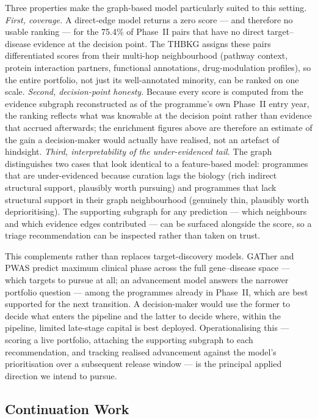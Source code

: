 \documentclass[a4,center]{NAR}
\begin{document}
{Three properties make the graph-based model particularly suited to this
setting. \emph{First, coverage.} A direct-edge model returns a zero
score --- and therefore no usable ranking --- for the 75.4\% of
Phase~II pairs that have no direct target--disease evidence at the
decision point. The THBKG assigns these pairs differentiated scores from
their multi-hop neighbourhood (pathway context, protein interaction
partners, functional annotations, drug-modulation profiles), so the
entire portfolio, not just its well-annotated minority, can be ranked on
one scale. \emph{Second, decision-point honesty.} Because every score is
computed from the evidence subgraph reconstructed as of the programme's
own Phase~II entry year, the ranking reflects what was knowable at the
decision point rather than evidence that accrued afterwards; the
enrichment figures above are therefore an estimate of the gain a
decision-maker would actually have realised, not an artefact of
hindsight. \emph{Third, interpretability of the under-evidenced tail.}
The graph distinguishes two cases that look identical to a feature-based
model: programmes that are under-evidenced because curation lags the
biology (rich indirect structural support, plausibly worth pursuing) and
programmes that lack structural support in their graph neighbourhood
(genuinely thin, plausibly worth deprioritising). The supporting
subgraph for any prediction --- which neighbours and which evidence
edges contributed --- can be surfaced alongside the score, so a triage
recommendation can be inspected rather than taken on trust.

This complements rather than replaces target-discovery models.
GATher \citep{Narganes-Carlon2024GATher:Links} and PWAS
\citep{Narganes-Carlon2023ATargets} predict maximum clinical phase across the
full gene--disease space --- which targets to pursue at all; an
advancement model answers the narrower portfolio question --- among the
programmes already in Phase~II, which are best supported for the next
transition. A decision-maker would use the former to decide what enters
the pipeline and the latter to decide where, within the pipeline,
limited late-stage capital is best deployed. Operationalising this ---
scoring a live portfolio, attaching the supporting subgraph to each
recommendation, and tracking realised advancement against the model's
prioritisation over a subsequent release window --- is the principal
applied direction we intend to pursue.


\subsection{Continuation Work}
\label{sec:discussion_continuation}

}
\end{document}
